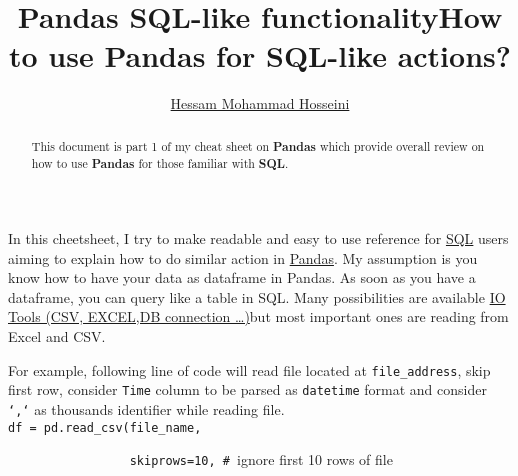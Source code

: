 \documentclass[11pt]{article}
\title{Pandas SQL-like functionality}
\makeatletter
\newcommand*\LyXZeroWidthSpace{\hspace{0pt}}
\renewcommand{\headrulewidth}{0.4pt}
\renewcommand{\footrulewidth}{0.4pt}
\let\ps@plain\ps@fancy   %
\makeatother
\begin{document}
\title{How to use Pandas for SQL-like actions?}
\author{\href{https://www.linkedin.com/in/hesam-mohammad-hosseini/}{Hessam Mohammad Hosseini}}
\maketitle
\begin{abstract}
This document is part 1 of my cheat sheet on \textbf{Pandas} which
provide overall review on how to use \textbf{Pandas} for those familiar
with \textbf{SQL}. 
\end{abstract}
\tableofcontents{}

%

In this cheetsheet, I try to make readable and easy to use reference
for \href{https://en.wikipedia.org/wiki/SQL}{SQL} users aiming to
explain how to do similar action in \href{https://pandas.pydata.org/}{Pandas}.
My assumption is you know how to have your data as dataframe in Pandas.
As soon as you have a dataframe, you can query like a table in SQL.
Many possibilities are available \href{https://pandas.pydata.org/pandas-docs/stable/user_guide/io.html}{IO Tools (CSV, EXCEL,DB connection \ldots)}but
most important ones are reading from Excel and CSV. 

For example, following line of code will read file located at \texttt{file\_address},
skip first row, consider \texttt{Time} column to be parsed as \texttt{datetime}
format and consider\texttt{ `,`} as thousands identifier while reading
file. \\

\texttt{df\ =\ pd.read\_csv(file\_name, }

\texttt{~~~~~~~~~~~~~~~~~skiprows=10, \# }ignore
first 10 rows of file
\end{document}
